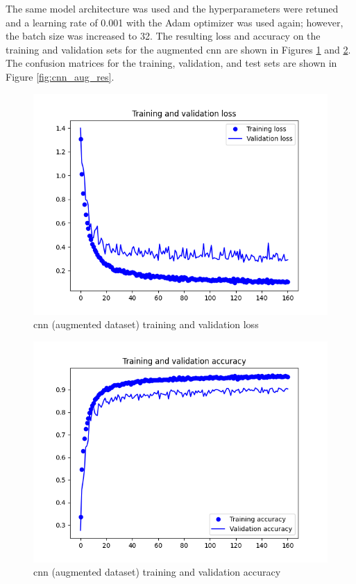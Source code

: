 \documentclass[10pt,twocolumn,letterpaper]{article}
\begin{document}
The same model architecture was used and the hyperparameters were retuned and a learning rate of 0.001 with the Adam optimizer was used again; however, the batch size was increased to 32. The resulting loss and accuracy on the training and validation sets for the augmented \acrshort{cnn} are shown in Figures \ref{fig:cnn_aug_loss} and \ref{fig:cnn_aug_accuracy}. The confusion matrices for the training, validation, and test sets are shown in Figure \ref{fig:cnn_aug_res}.

\begin{figure}[H]
  \centering
   \includegraphics[width=0.9\linewidth, trim={3em, 2em, 4em, 4em}, clip]{cnn_aug_loss}
   \caption{\acrshort{cnn} (augmented dataset) training and validation loss}
   \label{fig:cnn_aug_loss}
\end{figure}

\begin{figure}[H]
  \centering
   \includegraphics[width=0.9\linewidth, trim={3em, 2em, 4em, 4em}, clip]{cnn_aug_accuracy}
   \caption{\acrshort{cnn} (augmented dataset) training and validation accuracy}
   \label{fig:cnn_aug_accuracy}
\end{figure}
\end{document}
